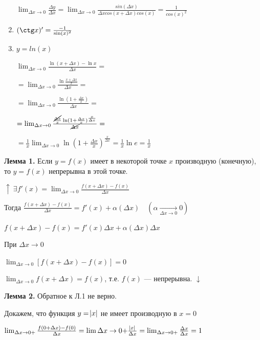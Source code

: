 \documentclass{article}
\begin{document}
\begin{enumerate}
            \( \lim_{\Delta x \to 0} \frac{\Delta y}{\Delta x} = \lim_{\Delta x \to 0} \frac{sin(\Delta x)}{\Delta x cos(x + \Delta x)cos(x)} = \frac{1}{cos(x)^2} \)
        
        \item \((\ctg x)' = \frac{-1}{\sin(x)^2}\)
        \item \(y = ln(x)\)

            \(\lim_{\Delta x \to 0}{\frac{\ln(x+\Delta x) - \ln x}{\Delta x}} =\)

            \(= \lim_{\Delta x \to 0}{\frac{\ln\frac{x + \Delta x}{x}}{\Delta x}} =\)

            \(= \lim_{\Delta x \to 0}{\frac{\ln(1+\frac{\Delta x}{x})}{\Delta x}} =\)

            \(= \lim_{\Delta x \to 0}{\frac{\frac{\cancel{\Delta x}}{x}\ln(1+\frac{\Delta x}{x})^\frac{x}{\Delta x}}{\cancel{\Delta x}}} =\)
            
            \(= \frac{1}{x}\lim_{\Delta x \to 0}{\ln(1 + \frac{\Delta x}{x})^\frac{x}{\Delta x}} = \frac{1}{x}\ln e = \frac{1}{x}\)
        
    \end{enumerate}

    \textbf{Лемма 1.} Если \(y = f(x)\) имеет в некоторой точке \(x\) производную (конечную), то \( y = f(x) \) непрерывна в этой точке.

    \( \uparrow\ \exists f'(x) = \lim_{\Delta x \to 0} \frac{f(x + \Delta x) - f(x)}{\Delta x} \) 

    Тогда \( \frac{f(x + \Delta x) - f(x)}{\Delta x} = f'(x) + \alpha(\Delta x)\quad (\alpha \xrightarrow[\Delta x \to 0]{} 0) \)

    \( f(x + \Delta x) - f(x) = f'(x)\Delta x + \alpha(\Delta x)\Delta x \)

    При \( \Delta x \to 0 \)

    \( \lim_{\Delta x \to 0} [f(x + \Delta x) - f(x)] = 0 \)

    \( \lim_{\Delta x \to 0} f(x + \Delta x) = f(x) \), т.е. \( f(x) \) --- непрерывна. \( \downarrow \)

    \textbf{Лемма 2.} Обратное к Л.1 не верно. 
    
    Докажем, что функция \( y = \abs{x} \) не имеет производную в \( x = 0 \)

    \( \lim_{\Delta x \to 0+} \frac{f(0 + \Delta x) - f(0)}{\Delta x} = \lim{\Delta x \to 0+} \frac{\abs{x}}{\Delta x} = \lim_{\Delta x \to 0+} \frac{\Delta x}{\Delta x} = 1 \)
\end{document}
